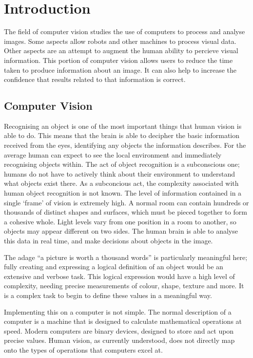 \documentclass[../main.tex]{subfiles}
\begin{document}
  \section{Introduction}
    The field of computer vision studies the use of computers to process and analyse images.
    Some aspects allow robots and other machines to process visual data.
    Other aspects are an attempt to augment the human ability to percieve visual information.
    This portion of computer vision allows users to reduce the time taken to produce information about an image.
    It can also help to increase the confidence that results related to that information is correct.
  
    \subsection{Computer Vision}
    Recognising an object is one of the most important things that human vision is able to do.
    This means that the brain is able to decipher the basic information received from the eyes, identifying any objects the information describes.
    For the average human can expect to see the local environment and immediately recognising objects within.
    The act of object recognition is a subconscious one; humans do not have to actively think about their environment to understand what objects exist there.
    As a subconcious act, the complexity associated with human object recognition is not known.
    The level of information contained in a single `frame' of vision is extremely high.
    A normal room can contain hundreds or thousands of distinct shapes and surfaces, which must be pieced together to form a cohesive whole.
    Light levels vary from one position in a room to another, so objects may appear different on two sides.
    The human brain is able to analyse this data in real time, and make decisions about objects in the image.

    The adage ``a picture is worth a thousand words'' is particularly meaningful here; fully creating and expressing a logical definition of an object would be an extensive and verbose task.
    This logical expression would have a high level of complexity, needing precise measurements of colour, shape, texture and more.
    It is a complex task to begin to define these values in a meaningful way.

    Implementing this on a computer is not simple.
    The normal description of a computer is a machine that is designed to calculate mathematical operations at speed.
    Modern computers are binary devices, designed to store and act upon precise values.
    Human vision, as currently understood, does not directly map onto the types of operations that computers excel at.
    
\end{document}
